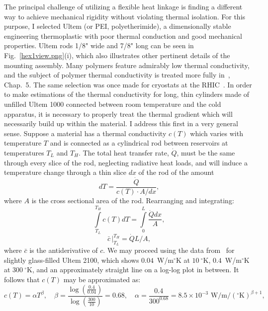 The principal challenge of utilizing a flexible heat linkage is finding a different way to achieve mechanical rigidity without violating thermal isolation.
For this purpose, I selected Ultem (or PEI, polyetherimide), a dimensionally stable engineering thermoplastic with poor thermal conduction and good mechanical properties.
Ultem rods 1/8" wide and 7/8" long can be seen in Fig.~\ref{hex1view.png}(i), which also illustrates other pertinent details of the mounting assembly.
Many polymers feature admirably low thermal conductivity, and the subject of polymer thermal conductivity is treated more fully in~\cite{Hartwig2013}, Chap.~5.
The same selection was once made for cryostats at the RHIC~\cite{Sondericker1994}.
In order to make estimations of the thermal conductivity for long, thin cylinders made of unfilled Ultem 1000 connected between room temperature and the cold apparatus, it is necessary to properly treat the thermal gradient which will necessarily build up within the material.
I address this first in a very general sense.
Suppose a material has a thermal conductivity $c(T)$ which varies with temperature $T$ and is connected as a cylindrical rod between reservoirs at temperatures $T_L$ and $T_H$.
The total heat transfer rate, $\dot{Q}$, must be the same through every slice of the rod, neglecting radiative heat loads, and will induce a temperature change through a thin slice $dx$ of the rod of the amount
\begin{equation}
dT = \frac{\dot{Q}}{c(T)\cdot A / dx},
\end{equation}
where $A$ is the cross sectional area of the rod. Rearranging and integrating:
\begin{equation}
\int\limits_{T_L}^{T_H}c(T)dT=\int\limits_0^L\frac{\dot{Q}dx}{A},
\end{equation}
\begin{equation}
\bar{c}\,\bigg|_{T_L}^{T_H} = \dot{Q}L/A,\label{qdoteq}
\end{equation}
where $\bar{c}$ is the antiderivative of $c$.
We may proceed using the data from~\cite{Sondericker1994} for slightly glass-filled Ultem 2100, which shows $0.04$~W/m$^\circ$K at $10\!~^\circ$K, $0.4$~W/m$^\circ$K at $300\!~^\circ$K, and an approximately straight line on a log-log plot in between.
It follows that $c(T)$ may be approximated as:
\begin{equation}
c(T) = \alpha T^\beta,\quad \beta = \frac{\log\left(\frac{0.4}{0.04}\right)}{\log\left(\frac{300}{10}\right)}=0.68,\quad \alpha = \frac{0.4}{300^{0.68}}=8.5\times10^{-3}\text{ W/m/}(^\circ\text{K})^{\beta+1},
\end{equation}

